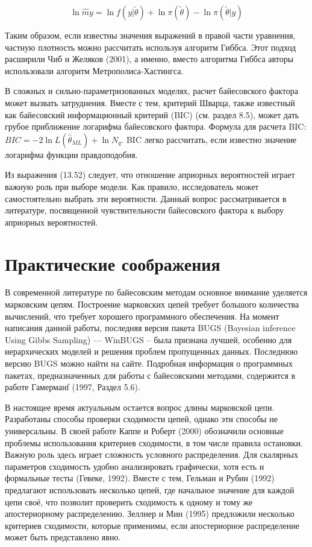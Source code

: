 \begin{equation}
\ln \hat{m}y=\ln {f(y|\tilde{\theta})}+\ln {\pi(\tilde{\theta})}-\ln {\pi(\tilde{\theta}|y)}
\end{equation}

Таким образом, если известны значения выражений в правой части уравнения, частную плотность можно рассчитать используя алгоритм Гиббса. Этот подход расширили Чиб и Желяков (2001), а именно, вместо алгоритма Гиббса авторы использовали алгоритм Метрополиса-Хастингса.

В сложных и сильно-параметризованных моделях, расчет байесовского фактора может вызвать затруднения. Вместе с тем,  критерий Шварца, также известный как байесовский информационный критерий (BIC) (см. раздел 8.5), может дать грубое приближение логарифма байесовского фактора. Формула для расчета BIC: $BIC=-2\ln {L}(\hat{\theta}_{ML})+\ln {N_q}$. BIC легко рассчитать, если известно значение логарифма функции правдоподобия.

Из выражения (13.52) следует, что отношение априорных вероятностей играет важную роль при выборе модели. Как правило, исследователь может самостоятельно выбрать эти вероятности. Данный вопрос  рассматривается в литературе, посвященной чувствительности байесовского фактора к выбору априорных вероятностей.

\section{Практические соображения}

В современной литературе по байесовским методам основное внимание уделяется марковским цепям. Построение марковских цепей требует большого количества вычислений, что требует хорошего программного обеспечения. На момент написания данной работы, последняя версия пакета BUGS (Bayesian inference Using Gibbs Sampling) --- WinBUGS -- была признана лучшей, особенно для иерархических моделей и решения проблем пропущенных данных. Последнюю версию BUGS можно найти на сайте. Подробная информация о программных пакетах, предназначенных для работы с байесовскими методами, содержится в работе Гамерманf (1997, Раздел 5.6).

В настоящее время актуальным остается вопрос длины марковской цепи. Разработаны способы проверки сходимости цепей, однако эти способы не универсальны. В своей работе Каппе и Роберт (2000) обозначили основные проблемы использования критериев сходимости, в том числе правила остановки. Важную роль здесь играет сложность условного распределения. Для скалярных параметров сходимость удобно анализировать графически, хотя есть  и формальные тесты (Гевеке, 1992). Вместе с тем,  Гельман и Рубин (1992) предлагают  использовать несколько цепей, где начальное значение для каждой цепи своё, что позволит проверить сходимость к одному и тому же апостериорному распределению. Зеллнер и Мин (1995) предложили несколько критериев сходимости, которые применимы, если апостериорное распределение может быть представлено явно.

